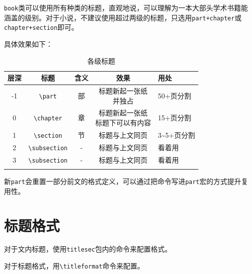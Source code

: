 \documentclass[10pt,openany]{book}
\begin{document}
\begin{sloppypar}
    \texttt{book}类可以使用所有种类的标题，直观地说，可以理解为一本大部头学术书籍能涵盖的级别。对于小说，不建议使用超过两级的标题，只选用\texttt{part+chapter}或\texttt{chapter+section}即可。

    具体效果如下：

    \begin{center}
        \begin{longtable}{ccccl}
            \textbf{层深} & \textbf{标题}                        & \textbf{含义} & \textbf{效果}       & \textbf{用处}           \\
            \hline
            \endfirsthead
            -1          & \texttt{\textbackslash part}       & 部           & \makecell{标题新起一张纸                         \\并独占} & 50+页分割  \\
            \hline
            0           & \texttt{\textbackslash chapter}    & 章           & \makecell{标题新起一张纸                         \\标题下可以有内容} & 15+页分割\\
            \hline
            1           & \texttt{\textbackslash section}    & 节           & 标题与上文同页           & 3\textasciitilde5+页分割 \\
            \hline
            2           & \texttt{\textbackslash subsection} & -           & 标题与上文同页           & 看着用                   \\
            \hline
            3           & \texttt{\textbackslash subsection} & -           & 标题与上文同页           & 看着用                   \\
            \hline
            \caption{各级标题}
        \end{longtable}
    \end{center}

    新\texttt{part}会重置一部分前文的格式定义，可以通过把命令写进\texttt{part}宏的方式提升复用性。

    

    \section{标题格式}

    对于文内标题，使用\texttt{titlesec}包内的命令来配置格式。

    对于标题格式，用\texttt{\textbackslash{}titleformat}命令来配置。


\end{sloppypar}
\end{document}

